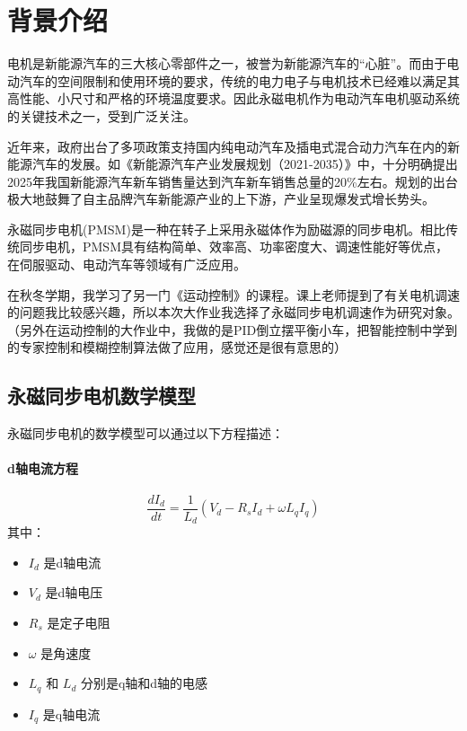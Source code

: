\documentclass[12pt,a4paper,UTF8]{article}
\begin{document}

\maketoc    %


\section{背景介绍}
电机是新能源汽车的三大核心零部件之一，被誉为新能源汽车的“心脏”。而由于电动汽车的空间限制和使用环境的要求，传统的电力电子与电机技术已经难以满足其高性能、小尺寸和严格的环境温度要求。因此永磁电机作为电动汽车电机驱动系统的关键技术之一，受到广泛关注。

近年来，政府出台了多项政策支持国内纯电动汽车及插电式混合动力汽车在内的新能源汽车的发展。如《新能源汽车产业发展规划（2021-2035）》中，十分明确提出2025年我国新能源汽车新车销售量达到汽车新车销售总量的20\%左右。规划的出台极大地鼓舞了自主品牌汽车新能源产业的上下游，产业呈现爆发式增长势头。

永磁同步电机(PMSM)是一种在转子上采用永磁体作为励磁源的同步电机。相比传统同步电机，PMSM具有结构简单、效率高、功率密度大、调速性能好等优点，在伺服驱动、电动汽车等领域有广泛应用\cite{zhihu2}。


在秋冬学期，我学习了另一门《运动控制》的课程。课上老师提到了有关电机调速的问题我比较感兴趣，所以本次大作业我选择了永磁同步电机调速作为研究对象。（另外在运动控制的大作业中，我做的是PID倒立摆平衡小车，把智能控制中学到的专家控制和模糊控制算法做了应用，感觉还是很有意思的）


\subsection{永磁同步电机数学模型}
永磁同步电机的数学模型可以通过以下方程描述\cite{DGJS202306019}：


\paragraph{d轴电流方程}
\begin{equation}
\frac{dI_d}{dt} = \frac{1}{L_d}(V_d - R_sI_d + \omega L_qI_q)
\end{equation}
其中：
\begin{itemize}
\item $I_d$ 是d轴电流
\item $V_d$ 是d轴电压
\item $R_s$ 是定子电阻
\item $\omega$ 是角速度
\item $L_q$ 和 $L_d$ 分别是q轴和d轴的电感
\item $I_q$ 是q轴电流
\end{itemize}
\end{document}
